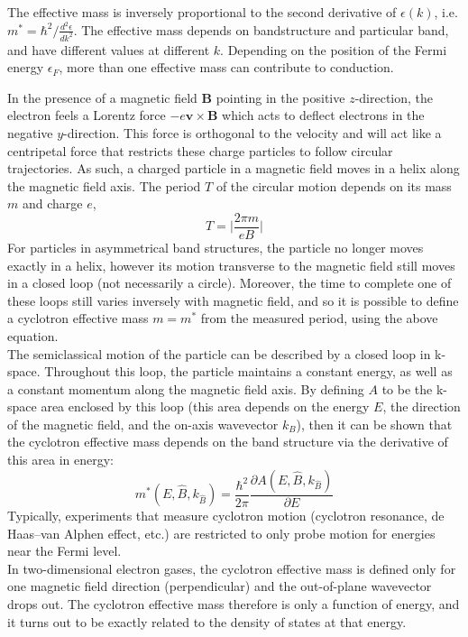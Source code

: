 \documentclass[a4paper]{article}
\begin{document}
\newpage
\begin{defi}
The effective mass is inversely proportional to the second derivative of $\epsilon(k)$, i.e. $m^*=\hbar^2/\frac{d^2\epsilon}{dk^2}$. The effective mass depends on bandstructure and particular band, and have different values at different $k$. Depending on the position of the Fermi energy $\epsilon_F$, more than one effective mass can contribute to conduction.
\end{defi}
\begin{Note}
In the presence of a magnetic field $\mathbf{B}$ pointing in the positive $z$-direction, the electron feels a  Lorentz force $-e\mathbf{v}\times\mathbf{B}$ which acts to deflect electrons in the negative $y$-direction. This force is orthogonal to the velocity and will act like a centripetal force that restricts these charge particles to follow circular trajectories. As such, a charged particle in a magnetic field moves in a helix along the magnetic field axis. The period $T$ of the circular motion depends on its mass $m$ and charge $e$,
$$T=\bigg|\frac{2\pi m}{eB}\bigg|$$
For particles in asymmetrical band structures, the particle no longer moves exactly in a helix, however its motion transverse to the magnetic field still moves in a closed loop (not necessarily a circle). Moreover, the time to complete one of these loops still varies inversely with magnetic field, and so it is possible to define a cyclotron effective mass $m=m^*$ from the measured period, using the above equation.\\[5pt]
The semiclassical motion of the particle can be described by a closed loop in k-space. Throughout this loop, the particle maintains a constant energy, as well as a constant momentum along the magnetic field axis. By defining $A$ to be the k-space area enclosed by this loop (this area depends on the energy $E$, the direction of the magnetic field, and the on-axis wavevector $k_B$), then it can be shown that the cyclotron effective mass depends on the band structure via the derivative of this area in energy:
$$m^*(E,\hat{B},k_{\hat{B}})=\frac{\hbar^2}{2\pi}\frac{\partial A(E,\hat{B},k_{\hat{B}})}{\partial E}$$
Typically, experiments that measure cyclotron motion (cyclotron resonance, de Haas–van Alphen effect, etc.) are restricted to only probe motion for energies near the Fermi level.\\[5pt]
In two-dimensional electron gases, the cyclotron effective mass is defined only for one magnetic field direction (perpendicular) and the out-of-plane wavevector drops out. The cyclotron effective mass therefore is only a function of energy, and it turns out to be exactly related to the density of states at that energy.\\[5pt]

\end{Note}
\end{document}

